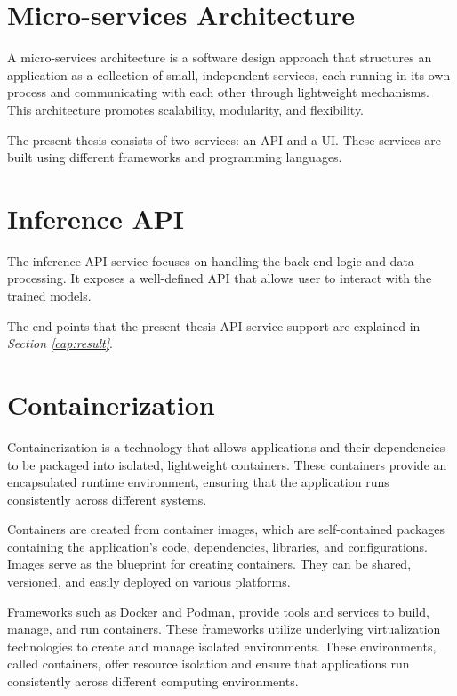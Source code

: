 \section{Micro-services Architecture}

A micro-services architecture is a software design approach that structures an
application as a collection of small, independent services, each running in its
own process and communicating with each other through lightweight mechanisms.
This architecture promotes scalability, modularity, and flexibility. \newline

The present thesis consists of two services: an API and a UI. These services
are built using different frameworks and programming languages.


\section{Inference API}

The inference API service focuses on handling the back-end logic and data
processing. It exposes a well-defined API that allows user to interact with the
trained models. \newline

The end-points that the present thesis API service support are explained in
\textit{Section \ref{cap:result}}.

\section{Containerization}

Containerization is a technology that allows applications and their
dependencies to be packaged into isolated, lightweight containers. These
containers provide an encapsulated runtime environment, ensuring that the
application runs consistently across different systems. \newline

Containers are created from container images, which are self-contained packages
containing the application's code, dependencies, libraries, and configurations.
Images serve as the blueprint for creating containers. They can be shared,
versioned, and easily deployed on various platforms. \newline

Frameworks such as Docker and Podman, provide tools and services to build,
manage, and run containers. These frameworks utilize underlying virtualization
technologies to create and manage isolated environments. These environments,
called containers, offer resource isolation and ensure that applications run
consistently across different computing environments.

